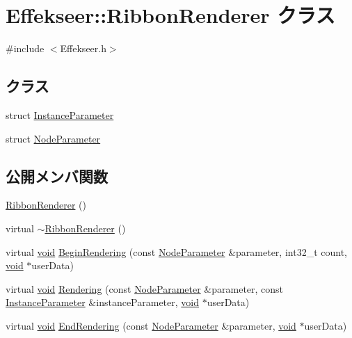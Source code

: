 \hypertarget{class_effekseer_1_1_ribbon_renderer}{}\section{Effekseer\+:\+:Ribbon\+Renderer クラス}
\label{class_effekseer_1_1_ribbon_renderer}


{\ttfamily \#include $<$Effekseer.\+h$>$}

\subsection*{クラス}
\begin{DoxyCompactItemize}
\item 
struct \mbox{\hyperlink{struct_effekseer_1_1_ribbon_renderer_1_1_instance_parameter}{Instance\+Parameter}}
\item 
struct \mbox{\hyperlink{struct_effekseer_1_1_ribbon_renderer_1_1_node_parameter}{Node\+Parameter}}
\end{DoxyCompactItemize}
\subsection*{公開メンバ関数}
\begin{DoxyCompactItemize}
\item 
\mbox{\hyperlink{class_effekseer_1_1_ribbon_renderer_a6ad9eea3ef4aa2edaf9011efedf4ccd5}{Ribbon\+Renderer}} ()
\item 
virtual \mbox{\hyperlink{class_effekseer_1_1_ribbon_renderer_a09d2d5d1f817b37430b6984be166c43e}{$\sim$\+Ribbon\+Renderer}} ()
\item 
virtual \mbox{\hyperlink{namespace_effekseer_ab34c4088e512200cf4c2716f168deb56}{void}} \mbox{\hyperlink{class_effekseer_1_1_ribbon_renderer_a9a41bef1c1c28eba5b331d72e1e4e38b}{Begin\+Rendering}} (const \mbox{\hyperlink{struct_effekseer_1_1_ribbon_renderer_1_1_node_parameter}{Node\+Parameter}} \&parameter, int32\+\_\+t count, \mbox{\hyperlink{namespace_effekseer_ab34c4088e512200cf4c2716f168deb56}{void}} $\ast$user\+Data)
\item 
virtual \mbox{\hyperlink{namespace_effekseer_ab34c4088e512200cf4c2716f168deb56}{void}} \mbox{\hyperlink{class_effekseer_1_1_ribbon_renderer_a3d1991348eeba97aa02c8082455edd39}{Rendering}} (const \mbox{\hyperlink{struct_effekseer_1_1_ribbon_renderer_1_1_node_parameter}{Node\+Parameter}} \&parameter, const \mbox{\hyperlink{struct_effekseer_1_1_ribbon_renderer_1_1_instance_parameter}{Instance\+Parameter}} \&instance\+Parameter, \mbox{\hyperlink{namespace_effekseer_ab34c4088e512200cf4c2716f168deb56}{void}} $\ast$user\+Data)
\item 
virtual \mbox{\hyperlink{namespace_effekseer_ab34c4088e512200cf4c2716f168deb56}{void}} \mbox{\hyperlink{class_effekseer_1_1_ribbon_renderer_ae8e99c5d635d3128047017c0f3c595bd}{End\+Rendering}} (const \mbox{\hyperlink{struct_effekseer_1_1_ribbon_renderer_1_1_node_parameter}{Node\+Parameter}} \&parameter, \mbox{\hyperlink{namespace_effekseer_ab34c4088e512200cf4c2716f168deb56}{void}} $\ast$user\+Data)
\end{DoxyCompactItemize}


